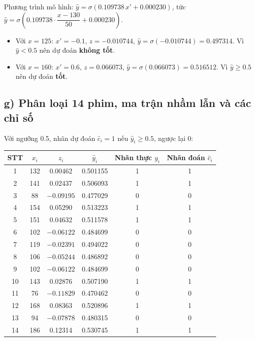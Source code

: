 \documentclass[a4paper,12pt]{article}
\begin{document}
Phương trình mô hình: $\hat{y} = \sigma(0.109738\,x' + 0.000230)$,
tức $\hat{y} = \sigma\!\left(0.109738\cdot\dfrac{x-130}{50} + 0.000230\right)$.

\begin{itemize}
  \item Với $x = 125$: $x' = -0.1$, $z = -0.010744$, $\hat{y} = \sigma(-0.010744) = 0.497314$.
        Vì $\hat{y} < 0.5$ nên dự đoán \textbf{không tốt}.
  \item Với $x = 160$: $x' = 0.6$, $z = 0.066073$, $\hat{y} = \sigma(0.066073) = 0.516512$.
        Vì $\hat{y} \geq 0.5$ nên dự đoán \textbf{tốt}.
\end{itemize}

\subsection*{g) Phân loại 14 phim, ma trận nhầm lẫn và các chỉ số}

Với ngưỡng 0.5, nhãn dự đoán $\hat{c}_i = 1$ nếu $\hat{y}_i \geq 0.5$, ngược lại $0$:

\begin{center}
\begin{tabular}{|c|c|c|c|c|c|}
\hline
STT & $x_i$ & $z_i$ & $\hat{y}_i$ & Nhãn thực $y_i$ & Nhãn đoán $\hat{c}_i$ \\
\hline
1 & 132 & 0.00462 & 0.501155 & 1 & 1 \\
2 & 141 & 0.02437 & 0.506093 & 1 & 1 \\
3 & 88 & $-0.09195$ & 0.477029 & 0 & 0 \\
4 & 154 & 0.05290 & 0.513223 & 1 & 1 \\
5 & 151 & 0.04632 & 0.511578 & 1 & 1 \\
6 & 102 & $-0.06122$ & 0.484699 & 0 & 0 \\
7 & 119 & $-0.02391$ & 0.494022 & 0 & 0 \\
8 & 106 & $-0.05244$ & 0.486892 & 0 & 0 \\
9 & 102 & $-0.06122$ & 0.484699 & 0 & 0 \\
10 & 143 & 0.02876 & 0.507190 & 1 & 1 \\
11 & 76 & $-0.11829$ & 0.470462 & 0 & 0 \\
12 & 168 & 0.08363 & 0.520896 & 1 & 1 \\
13 & 94 & $-0.07878$ & 0.480315 & 0 & 0 \\
14 & 186 & 0.12314 & 0.530745 & 1 & 1 \\
\hline
\end{tabular}
\end{center}
\end{document}
